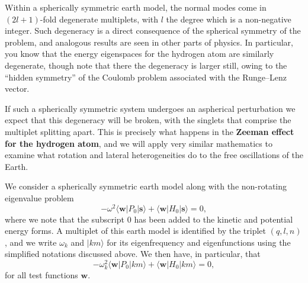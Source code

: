 Within a spherically symmetric earth model, the normal modes come in $(2l+1)$-fold degenerate multiplets, with $l$ the degree which is 
a non-negative integer. Such degeneracy is a direct consequence of the spherical symmetry of the problem, and analogous results are seen in other parts of physics. 
In particular, you know that the energy eigenspaces for the hydrogen atom are similarly degenerate, though note that there the degeneracy is larger still, owing to 
the ``hidden symmetry'' of the Coulomb problem associated with the Runge--Lenz vector. 

If such a spherically symmetric system undergoes an aspherical perturbation we expect that this degeneracy will be broken, with the singlets that
 comprise the multiplet splitting apart. This is precisely what happens in the \textbf{Zeeman effect for the hydrogen atom}, and we will apply very 
 similar mathematics to examine what rotation and lateral heterogeneities do to the free oscillations of the Earth.

We consider a spherically symmetric earth model along with the non-rotating eigenvalue problem
\begin{equation}\label{eq:19}
-\omega^{2}\langle \mathbf{w}|P_{0}|\mathbf{s}\rangle+\langle \mathbf{w}|H_{0}|\mathbf{s}\rangle=0,
\end{equation}
where we note that the subscript $0$ has been added to the kinetic and potential energy forms. A multiplet of 
this earth model is identified by the triplet $(q,l,n)$, and we write $\omega_{k}$ and $|km\rangle$ for its 
eigenfrequency and eigenfunctions using the simplified notations discussed above. We then have, in particular, that
\begin{equation}\label{eq:20}
-\omega_{k}^{2}\langle \mathbf{w}|P_{0}|km\rangle+\langle \mathbf{w}|H_{0}|km\rangle=0,
\end{equation}
for all test functions $\mathbf{w}$. 

